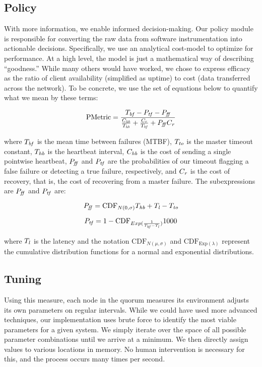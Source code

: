 \subsection{Policy}
With more information, we enable informed decision-making.
Our policy module is responsible for converting the raw data from software instrumentation into actionable decisions.
Specifically, we use an analytical cost-model to optimize for performance.
At a high level, the model is just a mathematical way of describing ``goodness.''
While many others would have worked, we chose to express efficacy as the ratio of client availability (simplified as uptime) to cost (data transferred across the network).
To be concrete, we use the set of equations below to quantify what we mean by these terms:

\begin{equation}
	\mathrm{PMetric} = \frac%
{	\Tbf - \Ptf - \Pff } %
{	\frac{\Chb}{\Thb} + \frac{\Cr}{\Tbf} + \Pff\Cr } %
\end{equation}

where $T_{\mathit{bf}}$ is the mean time between failures (MTBF), $T_{\mathit{to}}$ is the master timeout constant, $T_{\mathit{hb}}$ is the heartbeat interval, $C_{\mathit{hb}}$ is the cost of sending a single pointwise heartbeat, $P_{\mathit{ff}}$ and $P_{\mathit{tf}}$ are the probabilities of our timeout flagging a false failure or detecting a true failure, respectively, and $C_{\mathit{r}}$ is the cost of recovery, that is, the cost of recovering from a master failure.
The subexpressions are $P_{\mathit{ff}}$ and $P_{\mathit{tf}}$ are:

\begin{equation}
	P_{\mathit{ff}} = \mathrm{CDF}_{N(0,\sigma)} T_{\mathit{hb}} + T_{\mathit{l}} - T_{\mathit{to}}
\end{equation}

\begin{equation}
	P_{\mathit{tf}} = 1-\mathrm{CDF}_{Exp(\frac{1}{T_{\mathit{bf}}-T_{\mathit{l}}})} 1000
\end{equation}

where $T_{\mathit{l}}$ is the latency and the notation $\mathrm{CDF}_{N(\mu,\sigma)}$ and $\mathrm{CDF}_{\mathrm{Exp}(\lambda)}$ represent the cumulative distribution functions for a normal and exponential distributions.

\subsection{Tuning}
Using this measure, each node in the quorum measures its environment adjusts its own parameters on regular intervals.
While we could have used more advanced techniques, our implementation uses brute force to identify the most viable parameters for a given system.
We simply iterate over the space of all possible parameter combinations until we arrive at a minimum.
We then directly assign values to various locations in memory.
No human intervention is necessary for this, and the process occurs many times per second.




